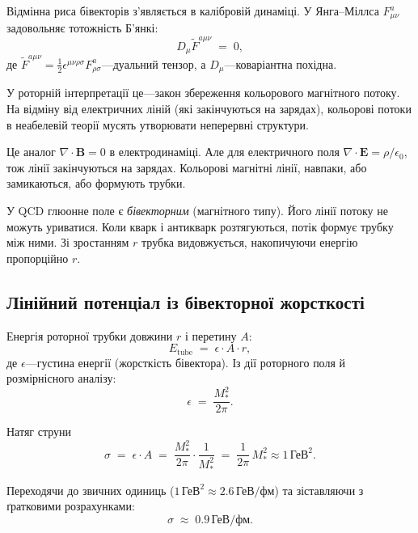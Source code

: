 \documentclass[11pt,a4paper]{article}
\theoremstyle{definition}
\theoremstyle{plain}
\theoremstyle{remark}
\begin{document}
Відмінна риса бівекторів з’являється в калібровій динаміці. У Янга–Міллса $F_{\mu\nu}^a$ задовольняє тотожність Б’янкі:
\begin{equation}
D_\mu \tilde{F}^{a\mu\nu} \;=\; 0,
\label{eq:bianchi-identity}
\end{equation}
де $\tilde{F}^{a\mu\nu}=\frac{1}{2}\epsilon^{\mu\nu\rho\sigma}F_{\rho\sigma}^a$—дуальний тензор, а $D_\mu$—коваріантна похідна.

У роторній інтерпретації це—закон збереження кольорового магнітного потоку. На відміну від електричних ліній (які закінчуються на зарядах), кольорові потоки в неабелевій теорії мусять утворювати неперервні структури.

Це аналог $\nabla\cdot\mathbf{B}=0$ в електродинаміці. Але для електричного поля $\nabla\cdot\mathbf{E}=\rho/\epsilon_0$, тож лінії закінчуються на зарядах. Кольорові магнітні лінії, навпаки, або замикаються, або формують трубки.

У QCD глюонне поле є \emph{бівекторним} (магнітного типу). Його лінії потоку не можуть уриватися. Коли кварк і антикварк розтягуються, потік формує трубку між ними. Зі зростанням $r$ трубка видовжується, накопичуючи енергію пропорційно $r$.

\subsection{Лінійний потенціал із бівекторної жорсткості}

Енергія роторної трубки довжини $r$ і перетину $A$:
\begin{equation}
E_{\mathrm{tube}} \;=\; \epsilon \cdot A \cdot r,
\label{eq:tube-energy}
\end{equation}
де $\epsilon$—густина енергії (жорсткість бівектора). Із дії роторного поля й розмірнісного аналізу:
\begin{equation}
\epsilon \;=\; \frac{M_\ast^2}{2\pi}.
\end{equation}

Натяг струни
\begin{equation}
\sigma \;=\; \epsilon \cdot A \;=\; \frac{M_\ast^2}{2\pi}\cdot\frac{1}{M_\ast^2} \;=\; \frac{1}{2\pi}\,M_\ast^2 \approx 1\,\text{ГеВ}^2.
\end{equation}

Переходячи до звичних одиниць ($1\,\text{ГеВ}^2 \approx 2{.}6\,\text{ГеВ/фм}$) та зіставляючи з ґратковими розрахунками:
\begin{equation}
\boxed{\sigma \;\approx\; 0{.}9\,\text{ГеВ/фм}.}
\label{eq:string-tension}
\end{equation}
\end{document}

